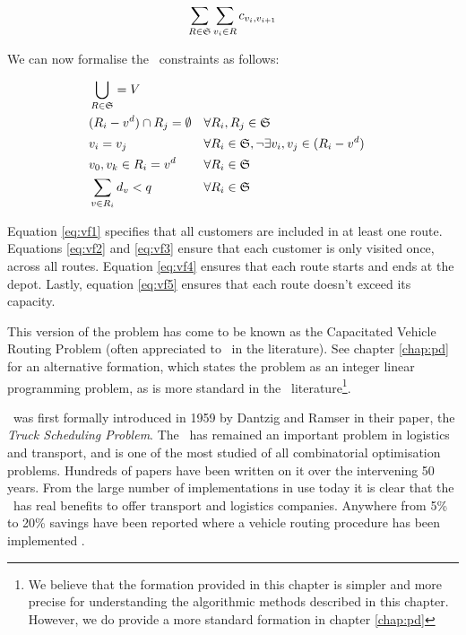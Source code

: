 \[
   \sum_{R \in \mathfrak{S}} \sum_{v_i \in R} c_{v_i, v_{i+1}}
\]

We can now formalise the \VRP\ constraints as follows:

\begin{align}
   & \bigcup_{R \in \mathfrak{S}} = V \label{eq:vf1}\\
   & (R_i - v^d) \cap R_j = \emptyset  && \forall R_i, R_j \in \mathfrak{S} \label{eq:vf2}\\
   & v_i = v_j                               && \forall R_i \in \mathfrak{S}, \lnot \exists v_i, v_j \in (R_i - v^d) \label{eq:vf3}\\
   & v_0, v_k \in R_i = v^d                  && \forall R_i \in \mathfrak{S} \label{eq:vf4}\\
   & \sum_{v \in R_i} d_v < q                && \forall R_i \in \mathfrak{S} \label{eq:vf5}
\end{align}

Equation \eqref{eq:vf1} specifies that all customers are included in at least one route. Equations \eqref{eq:vf2} and \eqref{eq:vf3} ensure that each customer is only visited once, across all routes. Equation \eqref{eq:vf4} ensures that each route starts and ends at the depot. Lastly, equation \eqref{eq:vf5} ensures that each route doesn't exceed its capacity. 

This version of the problem has come to be known as the Capacitated Vehicle Routing Problem (often appreciated to \CVRP\ in the literature). See chapter \ref{chap:pd} for an alternative formation, which states the problem as an integer linear programming problem, as is more standard in the \VRP\ literature\footnote{We believe that the formation provided in this chapter is simpler and more precise for understanding the algorithmic methods described in this chapter. However, we do provide a more standard formation in chapter \ref{chap:pd}}.

\VRP\ was first formally introduced in 1959 by Dantzig and Ramser in their paper, the \emph{Truck Scheduling Problem}\cite{Dantzig:1959}. The \VRP\ has remained an important problem in logistics and transport, and is one of the most studied of all combinatorial optimisation problems. Hundreds of papers have been written on it over the intervening 50 years. From the large number of implementations in use today it is clear that the \VRP\ has real benefits to offer transport and logistics companies. Anywhere from 5\% to 20\% savings have been reported where a vehicle routing procedure has been implemented \cite{TV2001}.

